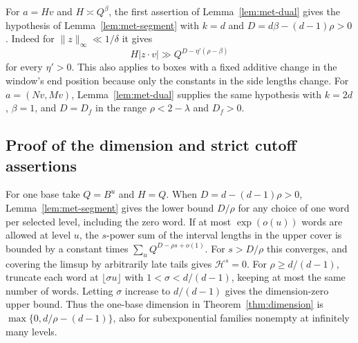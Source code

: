 \documentclass[11pt,reqno,a4paper]{amsart}
\theoremstyle{remark}
\begin{document}
For \(a=Hv\) and \(H\asymp Q^\beta\), the first assertion of
Lemma~\ref{lem:met-dual} gives the hypothesis of
Lemma~\ref{lem:met-segment} with \(k=d\) and
\(D=d\beta-(d-1)\rho>0\). Indeed for \(\|z\|_\infty\ll1/\delta\)
it gives
\[
 H|z\cdot v|\gg Q^{D-\eta'(\rho-\beta)}
\]
for every \(\eta'>0\). This also applies to boxes with a fixed
additive change in the window's end position because only the
constants in the side lengths change. For \(a=(Nv,Mv)\),
Lemma~\ref{lem:met-dual} supplies the same hypothesis with
\(k=2d\), \(\beta=1\), and \(D=D_f\) in the range
\(\rho<2-\lambda\) and \(D_f>0\).

\subsection{Proof of the dimension and strict cutoff assertions}

For one base take \(Q=B^u\) and \(H=Q\). When
\(D=d-(d-1)\rho>0\), Lemma~\ref{lem:met-segment} gives the lower
bound \(D/\rho\) for any choice of one word per selected level,
including the zero word. If at most \(\exp(o(u))\) words are
allowed at level \(u\), the \(s\)-power sum of the interval lengths
in the upper cover is bounded by a constant times
\(\sum_u Q^{D-\rho s+o(1)}\). For \(s>D/\rho\) this converges,
and covering the limsup by arbitrarily late tails gives
\(\mathcal H^s=0\). For \(\rho\geq d/(d-1)\), truncate each word
at \(\lfloor\sigma u\rfloor\) with \(1<\sigma<d/(d-1)\), keeping
at most the same number of words. Letting \(\sigma\) increase
to \(d/(d-1)\) gives the dimension-zero upper bound. Thus the
one-base dimension in Theorem~\ref{thm:dimension} is
\(\max\{0,d/\rho-(d-1)\}\), also for subexponential families
nonempty at infinitely many levels.
\end{document}
